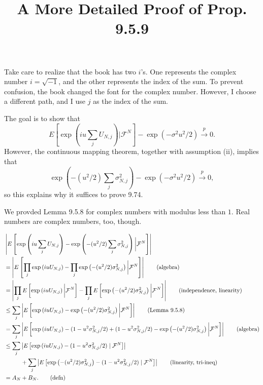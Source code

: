 \documentclass{article}
\title{A More Detailed Proof of Prop. 9.5.9}
\begin{document}
\maketitle

Take care to realize that the book has two $i$'s. One represents the complex number $i = \sqrt{-1}$, and the other represents the index of the sum. To prevent confusion, the book changed the font for the complex number. However, I choose a different path, and I use $j$ as the index of the sum. 
\newline

The goal is to show that 
\[
E\left[ \exp\left( i u \sum_j U_{N,j} \right) \bigg\rvert \mathcal{F}^N \right] - \exp(- \sigma^2 u^2/2) \overset{p}{\to} 0.
\]
However, the continuous mapping theorem, together with assumption (ii), implies that 
\[
\exp\left( -(u^2/2) \sum_j \sigma^2_{N,j}  \right) - \exp(- \sigma^2 u^2/2)\overset{p}{\to} 0,
\]
so this explains why it suffices to prove 9.74. 

We provded Lemma 9.5.8 for complex numbers with modulus less than $1$. Real numbers are complex numbers, too, though.


\begin{align*}
&  \left| E\left[\exp\left( i u \sum_j U_{N,j} \right) -  \exp\left( -(u^2/2) \sum_j \sigma^2_{N,j}  \right)  \bigg\rvert \mathcal{F}^N \right] \right| \\
&=  \left| E\left[ \prod_j \exp\left( i u  U_{N,j} \right) -  \prod_j \exp\left( -(u^2/2) \sigma^2_{N,j}  \right)  \bigg\rvert \mathcal{F}^N \right] \right| \tag{algebra}\\
&=  \left|  \prod_j E\left[ \exp\left( i u  U_{N,j} \right)\bigg\rvert \mathcal{F}^N \right] -  \prod_j E\left[\exp\left( -(u^2/2) \sigma^2_{N,j}  \right)  \bigg\rvert \mathcal{F}^N \right] \right| \tag{independence, linearity} \\
&\le  \sum_j \left| E\left[  \exp\left( i u  U_{N,j} \right) - \exp\left( -(u^2/2) \sigma^2_{N,j}  \right)  \bigg\rvert \mathcal{F}^N \right] \right| \tag{Lemma 9.5.8}\\
&=  \sum_j \left| E\left[  \exp\left( i u  U_{N,j} \right) - (1 - u^2 \sigma^2_{N,j}/2) + (1 - u^2 \sigma^2_{N,j}/2) -\exp\left( -(u^2/2) \sigma^2_{N,j}  \right)  \bigg\rvert \mathcal{F}^N \right] \right|  \tag{algebra}\\
&\le \sum_j \left| E\left[   \exp\left( i u U_{N,j} \right)  - (1 - u^2 \sigma^2_{N,j}/2) \mid \mathcal{F}^N \right] \right|  \\
&\hspace{10mm} + \sum_j  \left|E\left[  \exp\left( -(u^2/2) \sigma^2_{N,j}  \right) - (1 - u^2 \sigma^2_{N,j}/2)   \mid \mathcal{F}^N \right] \right| \tag{linearity, tri-ineq} \\
&= A_N + B_N. \tag{defn}
\end{align*}
\end{document}
